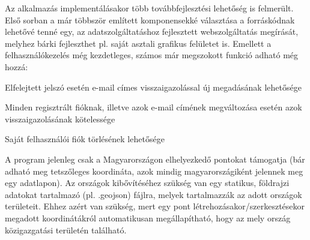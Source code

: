 Az alkalmazás implementálásakor több továbbfejlesztési lehetőség is felmerült. Első sorban a már többször említett komponensekké választása a forráskódnak lehetővé tenné egy, az adatszolgáltatáshoz fejlesztett webszolgáltatás megírását, melyhez bárki fejleszthet pl. saját asztali grafikus felületet is. Emellett a felhasználókezelés még kezdetleges, számos már megszokott funkció adható még hozzá:
\begin{compactitem}
	\item Elfelejtett jelszó esetén e-mail címes visszaigazolással új megadásának lehetősége
	\item Minden regisztrált fióknak, illetve azok e-mail címének megváltozása esetén azok visszaigazolásának kötelessége
	\item Saját felhasználói fiók törlésének lehetősége
\end{compactitem}
A program jelenleg csak a Magyarországon elhelyezkedő pontokat támogatja (bár adható meg tetszőleges koordináta, azok mindig magyarországiként jelennek meg egy adatlapon). Az országok kibővítéséhez szükség van egy statikus, földrajzi adatokat tartalmazó (pl. .geojson) fájlra, melyek tartalmazzák az adott országok területeit. Ehhez azért van szükség, mert egy pont létrehozásakor/szerkesztésekor megadott koordinátákról automatikusan megállapítható, hogy az mely ország közigazgatási területén található.